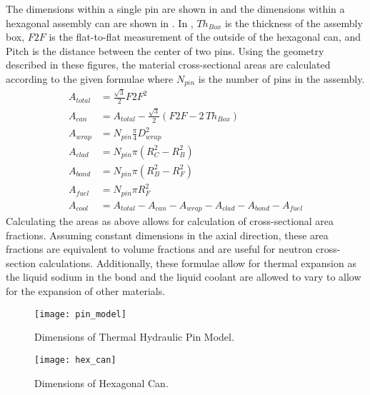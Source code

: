   The dimensions within a single pin are shown in  and the
  dimensions within a hexagonal assembly can are shown in . In
  , $T\!h_{Box}$ is the thickness of the assembly box,
  $F\!2\!F$ is the flat-to-flat measurement of the outside of the hexagonal can,
  and Pitch is the distance between the center of two pins.
  Using the geometry described in 
  these figures, the material cross-sectional areas are calculated according to 
  the given formulae where $N_{pin}$ is the number of pins in the assembly.
  \begin{align}
    \label{eq:afrac_first}
    A_{total} &= \frac{\sqrt{3}}{2} F\!2\!F^2 \\
    A_{can} &= A_{total} - 
      \frac{\sqrt{3}}{2} \left(  F\!2\!F - 2 \, T\!h_{Box} \right) \\
    A_{wrap} &= N_{pin} \frac{\pi}{4} D_{wrap}^2 \\
    A_{clad} &= N_{pin} \pi (R_C^2 - R_B^2) \\
    A_{bond} &= N_{pin} \pi (R_B^2 - R_F^2) \\
    A_{fuel} &= N_{pin} \pi R_F^2 \\
    \label{eq:afrac_last}
    A_{cool} &= A_{total} - A_{can} - A_{wrap} - A_{clad} - A_{bond} - A_{fuel}
  \end{align}
  Calculating the areas as above allows for calculation of cross-sectional area
  fractions. Assuming constant dimensions in the axial
  direction, these area fractions are equivalent to volume fractions and are
  useful for neutron cross-section calculations. Additionally, these formulae
  allow for thermal expansion as the liquid sodium in the bond and
  the liquid coolant are allowed to vary to allow for the expansion of other 
  materials.

  \begin{figure}
    \centering
    \texttt{[image: pin\_model]}
    \caption{Dimensions of Thermal Hydraulic Pin Model.}
    \label{fig:pin_model}
  \end{figure}

  \begin{figure}
    \centering
    \texttt{[image: hex\_can]}
    \caption{Dimensions of Hexagonal Can.}
    \label{fig:hex_can}
  \end{figure}

